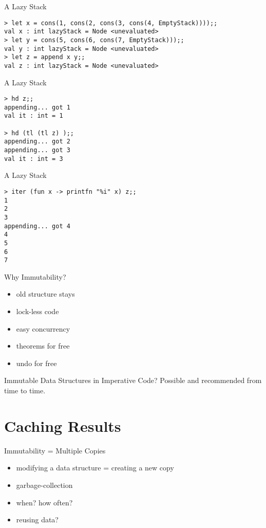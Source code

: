 \documentclass{beamer}
\begin{document}
\begin{frame}[fragile]{A Lazy Stack}
  \begin{verbatim}
> let x = cons(1, cons(2, cons(3, cons(4, EmptyStack))));;
val x : int lazyStack = Node <unevaluated>
> let y = cons(5, cons(6, cons(7, EmptyStack)));;
val y : int lazyStack = Node <unevaluated>
> let z = append x y;;
val z : int lazyStack = Node <unevaluated>
\end{verbatim}
\end{frame}

\begin{frame}[fragile]{A Lazy Stack}
  \begin{verbatim}
> hd z;;
appending... got 1
val it : int = 1

> hd (tl (tl z) );;
appending... got 2
appending... got 3
val it : int = 3
\end{verbatim}
\end{frame}

\begin{frame}[fragile]{A Lazy Stack}
  \begin{verbatim}
> iter (fun x -> printfn "%i" x) z;;
1
2
3
appending... got 4
4
5
6
7
  \end{verbatim}
\end{frame}

\begin{frame}{Why Immutability?}
  \begin{itemize}[<+->]
    \item old structure stays
    \item lock-less code
    \item easy concurrency
    \item theorems for free
    \item undo for free
  \end{itemize}
\end{frame}

\begin{frame}{Immutable Data Structures in Imperative Code?}
  Possible
  \pause
  and recommended from time to time.
\end{frame}

\section{Caching Results}
\frame{\tableofcontents[currentsection]}

\begin{frame}{Immutability = Multiple Copies}
  \begin{itemize}[<+->]
    \item modifying a data structure = creating a new copy
    \item garbage-collection
    \item when? how often?
    \item reusing data?
  \end{itemize}
\end{frame}
\end{document}
